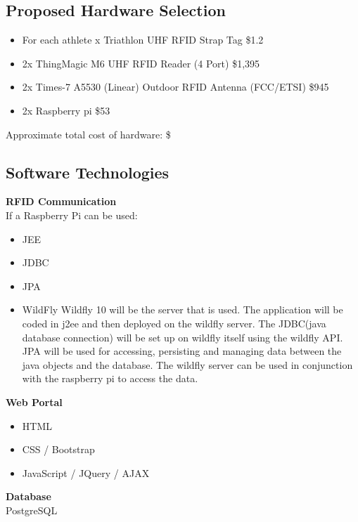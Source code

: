\documentclass{article}
\begin{document}
\subsection{Proposed Hardware Selection}
 \begin{itemize} 
 	\item For each athlete x Triathlon UHF RFID Strap Tag \quad \$1.2
 	\item 2x ThingMagic M6 UHF RFID Reader (4 Port) \quad \$1,395
 	\item 2x  Times-7 A5530 (Linear) Outdoor RFID Antenna (FCC/ETSI) \quad \$945
 	\item 2x  Raspberry pi \quad \$53
 \end{itemize}
 
 Approximate total cost of hardware: \quad  \$

\subsection{Software Technologies}
\textbf{RFID Communication} \\
If a Raspberry Pi can be used:
\begin{itemize}
	\item JEE
	\item JDBC
	\item JPA
	\item WildFly
Wildfly 10 will be the server that is used. The application will be coded in j2ee and then deployed on the wildfly server. The JDBC(java database connection) will be set up on wildfly itself using the wildfly API. JPA will be used for accessing, persisting and managing data between the java objects and the database. The wildfly server can be used in conjunction with  the raspberry pi to access the data. 
\end{itemize}
\textbf{Web Portal} 
\begin{itemize}
	\item HTML
	\item CSS / Bootstrap
	\item JavaScript / JQuery / AJAX
\end{itemize}
\textbf{Database} \\
PostgreSQL
\end{document}
